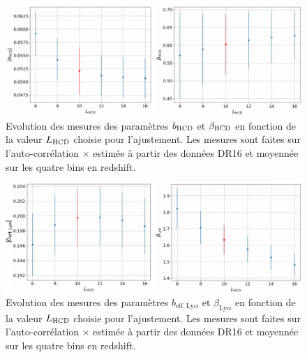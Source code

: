 \documentclass[11pt, twoside, a4paper, openright]{report}
\begin{document}
\begin{figure}
  \centering
  \includegraphics[scale=0.4]{bias_hcd_vs_L0_dr16}
  \caption{Evolution des mesures des paramètres $b_{\textsc{HCD}}$ et $\beta_{\textsc{HCD}}$ en fonction de la valeur $L_{\textsc{HCD}}$ choisie pour l'ajustement.
    Les mesures sont faites sur l'auto-corrélation \lya{}$\times$\lya{} estimée à partir des données DR16 et moyennée sur les quatre bins en redshift.
    }
  \label{fig:bias_hcd_vs_L0_dr16}
\end{figure}
\begin{figure}
  \centering
  \includegraphics[scale=0.45]{bias_lya_vs_L0_dr16}
  \caption{Evolution des mesures des paramètres $b_{\mathrm{eff},\mathrm{Ly}\alpha}$ et $\beta_{\mathrm{Ly}\alpha}$ en fonction de la valeur $L_{\textsc{HCD}}$ choisie pour l'ajustement.
    Les mesures sont faites sur l'auto-corrélation \lya{}$\times$\lya{} estimée à partir des données DR16 et moyennée sur les quatre bins en redshift.
    }
  \label{fig:bias_lya_vs_L0_dr16}
\end{figure}
\end{document}
